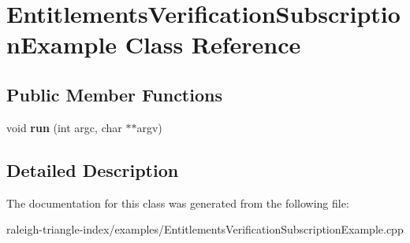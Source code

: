 \section{Entitlements\+Verification\+Subscription\+Example Class Reference}
\label{class_entitlements_verification_subscription_example}
\subsection*{Public Member Functions}
\begin{DoxyCompactItemize}
\item 
void {\bfseries run} (int argc, char $\ast$$\ast$argv)\label{class_entitlements_verification_subscription_example_ae10ab8aeadf5806d008282060b5027c7}

\end{DoxyCompactItemize}


\subsection{Detailed Description}


The documentation for this class was generated from the following file\+:\begin{DoxyCompactItemize}
\item 
raleigh-\/triangle-\/index/examples/Entitlements\+Verification\+Subscription\+Example.\+cpp\end{DoxyCompactItemize}
